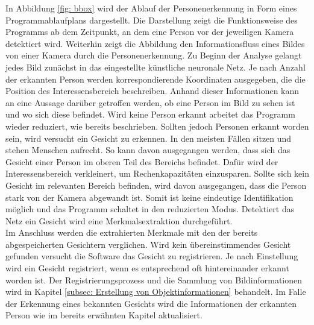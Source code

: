 	In Abbildung \ref{fig: bbox} wird der Ablauf der Personenerkennung in Form eines Programmablaufplans dargestellt. Die Darstellung zeigt die Funktionsweise des Programms ab dem Zeitpunkt, an dem eine Person vor der jeweiligen Kamera detektiert wird. Weiterhin zeigt die Abbildung den Informationsfluss eines Bildes von einer Kamera durch die Personenerkennung. Zu Beginn der Analyse gelangt jedes Bild zunächst in das eingestellte künstliche neuronale Netz. Je nach Anzahl der erkannten Person werden korrespondierende Koordinaten ausgegeben, die die Position des Interessensbereich beschreiben. Anhand dieser Informationen kann an eine Aussage darüber getroffen werden, ob eine Person im Bild zu sehen ist und wo sich diese befindet. Wird keine Person erkannt arbeitet das Programm wieder reduziert, wie bereits beschrieben. Sollten jedoch Personen erkannt worden sein, wird versucht ein Gesicht zu erkennen. In den meisten Fällen sitzen und stehen Menschen aufrecht. So kann davon ausgegangen werden, dass sich das Gesicht einer Person im oberen Teil des Bereichs befindet. Dafür wird der Interessensbereich verkleinert, um Rechenkapazitäten einzusparen. Sollte sich kein Gesicht im relevanten Bereich befinden, wird davon ausgegangen, dass die Person stark von der Kamera abgewandt ist. Somit ist keine eindeutige Identifikation möglich und das Programm schaltet in den reduzierten Modus. Detektiert das Netz ein Gesicht wird eine Merkmalsextraktion durchgeführt.\\
	
	Im Anschluss werden die extrahierten Merkmale mit den der bereits abgespeicherten Gesichtern verglichen. Wird kein übereinstimmendes Gesicht gefunden versucht die Software das Gesicht zu registrieren. Je nach Einstellung wird ein Gesicht registriert, wenn es entsprechend oft hintereinander erkannt worden ist. Der Registrierungsprozess und die Sammlung von Bildinformationen wird in Kapitel \ref{subsec: Erstellung von Objektinformationen} behandelt. Im Falle der Erkennung eines bekannten Gesichts wird die Informationen der erkannten Person wie im bereits erwähnten Kapitel aktualisiert.\\ 
	

